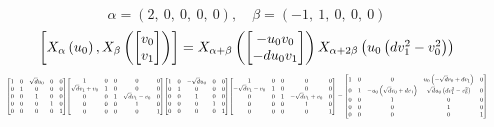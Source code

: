\documentclass[11pt]{article}
\theoremstyle{definition}
\begin{document}
\[
\alpha = \left( 2, \  0, \  0, \  0, \  0\right), \quad \beta = \left( -1, \  1, \  0, \  0, \  0\right)
\]
\[
\scaletoalign{\textwidth}{\left[ X_{\alpha}\left(u_{0}\right), X_{\beta}\left(\left[\begin{matrix}v_{0}\\v_{1}\end{matrix}\right]\right) \right] = X_{\alpha + \beta}\left(\left[\begin{matrix}- u_{0} v_{0}\\- d u_{0} v_{1}\end{matrix}\right]\right) X_{\alpha + 2\beta}\left(u_{0} \left(d v_{1}^{2} - v_{0}^{2}\right)\right)}
\]
\[
\scaletoalign{\textwidth}{{\left[\begin{matrix}1 & 0 & \sqrt{d} u_{0} & 0 & 0\\0 & 1 & 0 & 0 & 0\\0 & 0 & 1 & 0 & 0\\0 & 0 & 0 & 1 & 0\\0 & 0 & 0 & 0 & 1\end{matrix}\right]} {\left[\begin{matrix}1 & 0 & 0 & 0 & 0\\\sqrt{d} v_{1} + v_{0} & 1 & 0 & 0 & 0\\0 & 0 & 1 & \sqrt{d} v_{1} - v_{0} & 0\\0 & 0 & 0 & 1 & 0\\0 & 0 & 0 & 0 & 1\end{matrix}\right]} {\left[\begin{matrix}1 & 0 & - \sqrt{d} u_{0} & 0 & 0\\0 & 1 & 0 & 0 & 0\\0 & 0 & 1 & 0 & 0\\0 & 0 & 0 & 1 & 0\\0 & 0 & 0 & 0 & 1\end{matrix}\right]} {\left[\begin{matrix}1 & 0 & 0 & 0 & 0\\- \sqrt{d} v_{1} - v_{0} & 1 & 0 & 0 & 0\\0 & 0 & 1 & - \sqrt{d} v_{1} + v_{0} & 0\\0 & 0 & 0 & 1 & 0\\0 & 0 & 0 & 0 & 1\end{matrix}\right]} = {\left[\begin{matrix}1 & 0 & 0 & u_{0} \left(- \sqrt{d} v_{0} + d v_{1}\right) & 0\\0 & 1 & - u_{0} \left(\sqrt{d} v_{0} + d v_{1}\right) & \sqrt{d} u_{0} \left(d v_{1}^{2} - v_{0}^{2}\right) & 0\\0 & 0 & 1 & 0 & 0\\0 & 0 & 0 & 1 & 0\\0 & 0 & 0 & 0 & 1\end{matrix}\right]}}
\]
\end{document}
